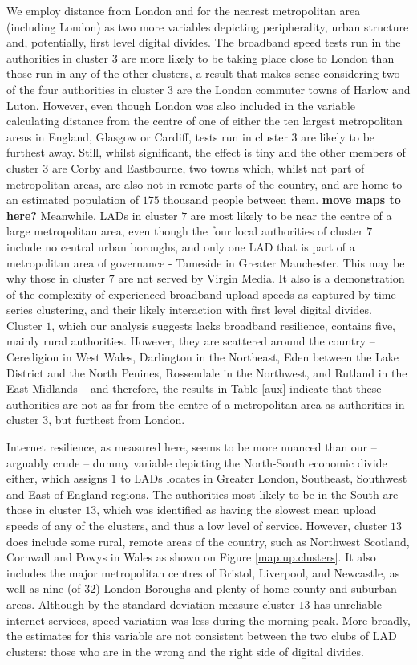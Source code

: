 \documentclass[Royal,times,sageh]{sagej}
\begin{document}
We employ distance from London and for the nearest metropolitan area
(including London) as two more variables depicting peripherality, urban
structure and, potentially, first level digital divides. The broadband
speed tests run in the authorities in cluster \(3\) are more likely to
be taking place close to London than those run in any of the other
clusters, a result that makes sense considering two of the four
authorities in cluster \(3\) are the London commuter towns of Harlow and
Luton. However, even though London was also included in the variable
calculating distance from the centre of one of either the ten largest
metropolitan areas in England, Glasgow or Cardiff, tests run in cluster
\(3\) are likely to be furthest away. Still, whilst significant, the
effect is tiny and the other members of cluster \(3\) are Corby and
Eastbourne, two towns which, whilst not part of metropolitan areas, are
also not in remote parts of the country, and are home to an estimated
population of \(175\) thousand people between them. \textbf{move maps to
here?} Meanwhile, LADs in cluster \(7\) are most likely to be near the
centre of a large metropolitan area, even though the four local
authorities of cluster \(7\) include no central urban boroughs, and only
one LAD that is part of a metropolitan area of governance - Tameside in
Greater Manchester. This may be why those in cluster \(7\) are not
served by Virgin Media. It also is a demonstration of the complexity of
experienced broadband upload speeds as captured by time-series
clustering, and their likely interaction with first level digital
divides. Cluster \(1\), which our analysis suggests lacks broadband
resilience, contains five, mainly rural authorities. However, they are
scattered around the country -- Ceredigion in West Wales, Darlington in
the Northeast, Eden between the Lake District and the North Penines,
Rossendale in the Northwest, and Rutland in the East Midlands -- and
therefore, the results in Table \ref{aux} indicate that these
authorities are not as far from the centre of a metropolitan area as
authorities in cluster \(3\), but furthest from London.

Internet resilience, as measured here, seems to be more nuanced than our
-- arguably crude -- dummy variable depicting the North-South economic
divide either, which assigns \(1\) to LADs locates in Greater London,
Southeast, Southwest and East of England regions. The authorities most
likely to be in the South are those in cluster \(13\), which was
identified as having the slowest mean upload speeds of any of the
clusters, and thus a low level of service. However, cluster \(13\) does
include some rural, remote areas of the country, such as Northwest
Scotland, Cornwall and Powys in Wales as shown on Figure
\ref{map.up.clusters}. It also includes the major metropolitan centres
of Bristol, Liverpool, and Newcastle, as well as nine (of \(32\)) London
Boroughs and plenty of home county and suburban areas. Although by the
standard deviation measure cluster \(13\) has unreliable internet
services, speed variation was less during the morning peak. More
broadly, the estimates for this variable are not consistent between the
two clubs of LAD clusters: those who are in the wrong and the right side
of digital divides.
\end{document}
